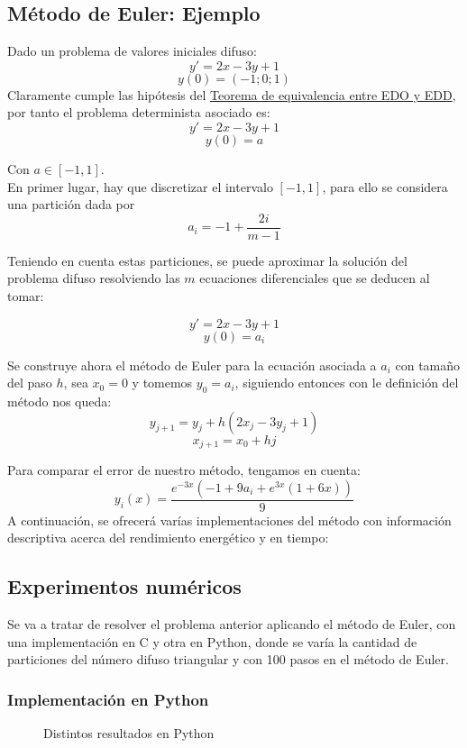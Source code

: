 \subsection{Método de Euler: Ejemplo}
\begin{ejemplo}
Dado un problema de valores iniciales difuso:
\[
y' = 2x - 3y + 1
\]
\[
y(0) = (-1;0;1)
\]
Claramente cumple las hipótesis del \hyperref[teorema:equivalencia]{Teorema de equivalencia entre EDO y EDD}, por tanto el problema determinista asociado es:
\[
y' = 2x - 3y + 1
\]
\[
y(0) = a
\]

Con $a \in [-1, 1]$. \\
En primer lugar, hay que discretizar el intervalo $[-1, 1]$, para ello se considera una partición dada por 
\[
a_i = -1 + \frac{2i}{m-1}
\]

Teniendo en cuenta estas particiones, se puede aproximar la solución del problema difuso resolviendo las $m$ ecuaciones diferenciales que se deducen al tomar:

\[
y' = 2x - 3y + 1
\]
\[
y(0) = a_i
\]

Se construye ahora el método de Euler para la ecuación asociada a $a_i$ con tamaño del paso $h$, sea $x_0=0$ y tomemos $y_0 = a_i$, siguiendo entonces con le definición del método nos queda:
\[
y_{j+1} = y_j + h (2x_j - 3y_j + 1)
\]
\[
x_{j+1} = x_0 + hj
\]

Para comparar el error de nuestro método, tengamos en cuenta:
\[
y_i(x) = \frac{e^{-3 x} (-1 + 9 a_i + e^{3 x}(1 + 6 x))}{9}
\]
A continuación, se ofrecerá varías implementaciones del método con información descriptiva acerca del rendimiento energético y en tiempo:

\subsection{Experimentos numéricos}
Se va a tratar de resolver el problema anterior aplicando el método de Euler, con una implementación en C y otra en Python, donde se varía la cantidad de particiones del número difuso triangular y con 100 pasos en el método de Euler.
\subsubsection{Implementación en Python}
\begin{figure}[H]
	\centering
	\caption{Distintos resultados en Python}
	\label{fig:eulerpython}
\end{figure}


\end{ejemplo}
